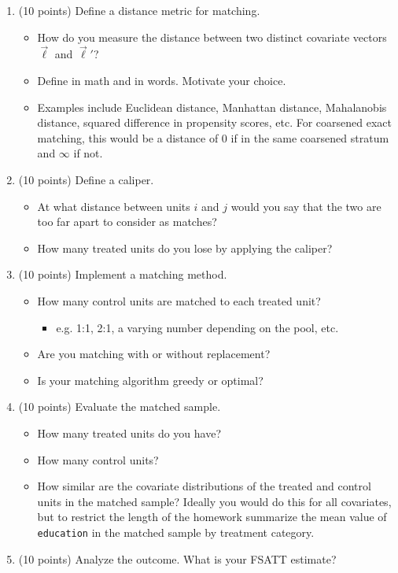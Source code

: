 \documentclass[10pt]{article}
\begin{document}
\begin{enumerate}
    \item (10 points) Define a distance metric for matching.
    \begin{itemize}
        \item How do you measure the distance between two distinct covariate vectors $\vec\ell$ and $\vec\ell'$?
        \item Define in math and in words. Motivate your choice.
        \item Examples include Euclidean distance, Manhattan distance, Mahalanobis distance, squared difference in propensity scores, etc. For coarsened exact matching, this would be a distance of 0 if in the same coarsened stratum and $\infty$ if not.
    \end{itemize}
    \item (10 points) Define a caliper.
    \begin{itemize}
        \item At what distance between units $i$ and $j$ would you say that the two are too far apart to consider as matches?
        \item How many treated units do you lose by applying the caliper?
    \end{itemize}
    \item (10 points) Implement a matching method.
    \begin{itemize}
        \item How many control units are matched to each treated unit?
        \begin{itemize}
            \item e.g. 1:1, 2:1, a varying number depending on the pool, etc.
        \end{itemize}
        \item Are you matching with or without replacement?
        \item Is your matching algorithm greedy or optimal?
    \end{itemize}
    \item (10 points) Evaluate the matched sample.
    \begin{itemize}
        \item How many treated units do you have?
        \item How many control units?
        \item How similar are the covariate distributions of the treated and control units in the matched sample? Ideally you would do this for all covariates, but to restrict the length of the homework summarize the mean value of \texttt{education} in the matched sample by treatment category.
    \end{itemize}
    \item (10 points) Analyze the outcome. What is your FSATT estimate?
\end{enumerate}
\end{document}
